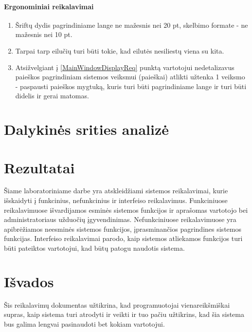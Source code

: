 \documentclass[12pt]{article}
\begin{document}
	\subsection{Ergonominiai reikalavimai}
	\begin{enumerate}[labelindent=10pt,leftmargin=2.2cm]
		\item Šriftų dydis pagrindiniame lange ne mažesnis nei 20 pt, skelbimo formate - ne mažesnis nei 10 pt.
		\item Tarpai tarp eilučių turi būti tokie, kad eilutės nesiliestų viena su kita.
		\item Atsižvelgiant į \ref{MainWindowDisplayReq} punktą vartotojui nedetalizavus paieškos pagrindiniam sistemos veiksmui (paieškai) atlikti užtenka 1 veiksmo - paspausti paieškos mygtuką, kuris turi būti pagrindiniame lange ir turi būti didelis ir gerai matomas.
	\end{enumerate}
	\pagebreak
	
	\part*{Dalykinės srities analizė}
	
	
	
	
	\pagebreak
	
	\part*{Rezultatai}	
	Šiame laboratoriniame darbe yra atskleidžiami sistemos reikalavimai, kurie išskaidyti į funkcinius, nefunkcinius ir interfeiso reikalavimus. Funkciniuose reikalavimuose išvardijamos esminės sistemos funkcijos ir aprašomas vartotojo bei administratoriaus užduočių įgyvendinimas. Nefunkciniuose reikalavimuose yra apibrėžiamos neesminės sistemos funkcijos, įprasminančios pagrindines sistemos funkcijas. Interfeiso reikalavimai parodo, kaip sistemos atliekamos funkcijos turi būti pateiktos vartotojui, kad būtų patogu naudotis sistema.
	\pagebreak
	
	\part*{Išvados}	
	Šis reikalavimų dokumentas užtikrina, kad programuotojai vienareikšmiškai supras, kaip sistema turi atrodyti ir veikti ir tuo pačiu užtikrins, kad šia sistema bus galima lengvai pasinaudoti bet kokiam vartotojui.
	\pagebreak
\end{document}

